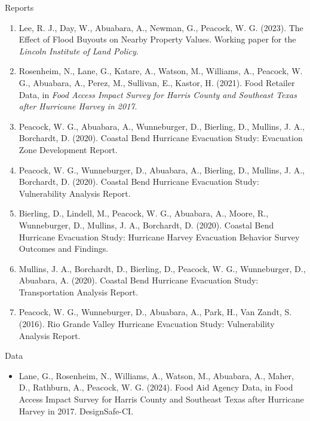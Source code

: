 \documentclass[11pt,oneside]{article}
\begin{document}
{Reports}
\begin{enumerate}[leftmargin=20pt]
\item Lee, R. J., Day, W., Abuabara, A., Newman, G., Peacock, W. G. (2023). The Effect of Flood Buyouts on Nearby Property Values. Working paper for the \emph{Lincoln Institute of Land Policy}.
\item Rosenheim, N., Lane, G., Katare, A., Watson, M., Williams, A., Peacock, W. G., Abuabara, A., Perez, M., Sullivan, E., Kastor, H. (2021). Food Retailer Data, in \emph{Food Access Impact Survey for Harris County and Southeast Texas after Hurricane Harvey in 2017}.
\item Peacock, W. G., Abuabara, A., Wunneburger, D., Bierling, D., Mullins, J. A., Borchardt, D. (2020). Coastal Bend Hurricane Evacuation Study: Evacuation Zone Development Report.
\item Peacock, W. G., Wunneburger, D., Abuabara, A., Bierling, D., Mullins, J. A., Borchardt, D. (2020). Coastal Bend Hurricane Evacuation Study: Vulnerability Analysis Report.
\item Bierling, D., Lindell, M., Peacock, W. G., Abuabara, A., Moore, R., Wunneburger, D., Mullins, J. A., Borchardt, D. (2020). Coastal Bend Hurricane Evacuation Study: Hurricane Harvey Evacuation Behavior Survey Outcomes and Findings.
\item Mullins, J. A., Borchardt, D., Bierling, D., Peacock, W. G., Wunneburger, D., Abuabara, A. (2020). Coastal Bend Hurricane Evacuation Study: Transportation Analysis Report.
\item Peacock, W. G., Wunneburger, D., Abuabara, A., Park, H., Van Zandt, S. (2016). Rio Grande Valley Hurricane Evacuation Study: Vulnerability Analysis Report.
\end{enumerate}

\vspace{3pt}

{Data}
\begin{itemize}[leftmargin=20pt]
\item Lane, G., Rosenheim, N., Williams, A., Watson, M., Abuabara, A., Maher, D., Rathburn, A., Peacock, W. G. (2024). Food Aid Agency Data, in Food Access Impact Survey for Harris County and Southeast Texas after Hurricane Harvey in 2017. DesignSafe-CI.
\end{itemize}

\vspace{3pt}
\end{document}

